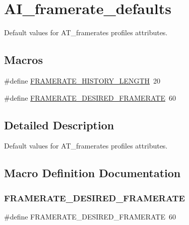 \hypertarget{group__AI__framerate__defaults}{}\section{A\+I\+\_\+framerate\+\_\+defaults}
\label{group__AI__framerate__defaults}


Default values for A\+T\+\_\+framerate\textquotesingle{}s profile\textquotesingle{}s attributes.  


\subsection*{Macros}
\begin{DoxyCompactItemize}
\item 
\#define \hyperlink{group__AI__framerate__defaults_ga94b51f0f175147023f02be6ece8d249b}{F\+R\+A\+M\+E\+R\+A\+T\+E\+\_\+\+H\+I\+S\+T\+O\+R\+Y\+\_\+\+L\+E\+N\+G\+TH}~20
\item 
\#define \hyperlink{group__AI__framerate__defaults_ga2b0a2c74173b88fb47b997385077e0ea}{F\+R\+A\+M\+E\+R\+A\+T\+E\+\_\+\+D\+E\+S\+I\+R\+E\+D\+\_\+\+F\+R\+A\+M\+E\+R\+A\+TE}~60
\end{DoxyCompactItemize}


\subsection{Detailed Description}
Default values for A\+T\+\_\+framerate\textquotesingle{}s profile\textquotesingle{}s attributes. 



\subsection{Macro Definition Documentation}
\mbox{\label{group__AI__framerate__defaults_ga2b0a2c74173b88fb47b997385077e0ea}} 
\subsubsection{\texorpdfstring{F\+R\+A\+M\+E\+R\+A\+T\+E\+\_\+\+D\+E\+S\+I\+R\+E\+D\+\_\+\+F\+R\+A\+M\+E\+R\+A\+TE}{FRAMERATE\_DESIRED\_FRAMERATE}}
{\footnotesize\ttfamily \#define F\+R\+A\+M\+E\+R\+A\+T\+E\+\_\+\+D\+E\+S\+I\+R\+E\+D\+\_\+\+F\+R\+A\+M\+E\+R\+A\+TE~60}

